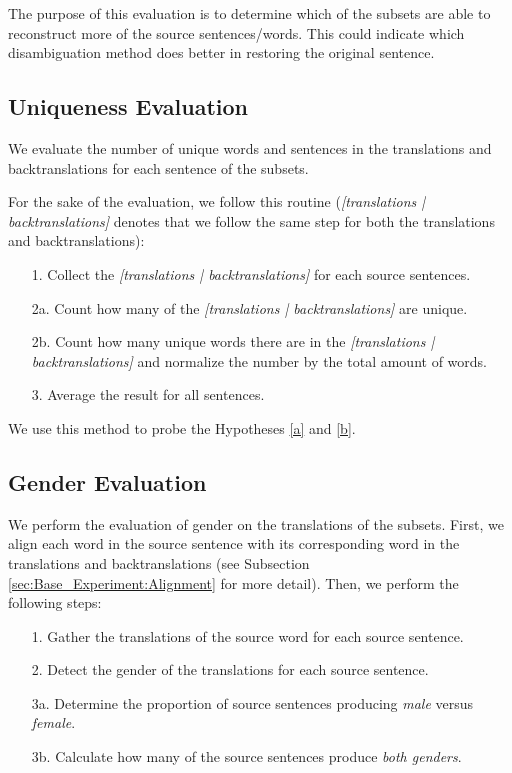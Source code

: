 The purpose of this evaluation is to determine which of the subsets are able to reconstruct more of the source sentences/words. This could indicate which disambiguation method does better in restoring the original sentence.

\subsection{Uniqueness Evaluation}
\label{sec:Base_Experiment:Statistics:Uniqueness}
We evaluate the number of unique words and sentences in the translations and backtranslations for each sentence of the subsets. 

For the sake of the evaluation, we follow this routine (\textit{[translations | backtranslations]} denotes that we follow the same step for both the translations and backtranslations):
\begin{enumerate}
    \item[1. ] Collect the \textit{[translations | backtranslations]} for each source sentences.
    \item[2a. ] Count how many of the \textit{[translations | backtranslations]} are unique. 
    \item[2b. ] Count how many unique words there are in the \textit{[translations | backtranslations]} and normalize the number by the total amount of words. 
    \item[3. ] Average the result for all sentences.
\end{enumerate}

We use this method to probe the Hypotheses \ref{a} and \ref{b}. 

\subsection{Gender Evaluation}
\label{sec:Base_Experiment:Statistics:Gender}
We perform the evaluation of gender on the translations of the subsets.  First, we align each word in the source sentence with its corresponding word in the translations and backtranslations (see Subsection \ref{sec:Base_Experiment:Alignment} for more detail). Then, we perform the following steps:

\begin{enumerate}
    \item[1. ] Gather the translations of the source word for each source sentence.
    \item[2. ] Detect the gender of the translations for each source sentence.
    \item[3a. ] Determine the proportion of source sentences producing \textit{male} versus \textit{female}.
    \item[3b. ] Calculate how many of the source sentences produce \textit{both genders}. 
\end{enumerate}


